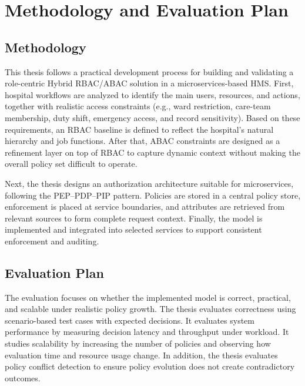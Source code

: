 \section{Methodology and Evaluation Plan}

\subsection{Methodology}
This thesis follows a practical development process for building and validating a role-centric Hybrid RBAC/ABAC solution in a microservices-based HMS. First, hospital workflows are analyzed to identify the main users, resources, and actions, together with realistic access constraints (e.g., ward restriction, care-team membership, duty shift, emergency access, and record sensitivity). Based on these requirements, an RBAC baseline is defined to reflect the hospital’s natural hierarchy and job functions. After that, ABAC constraints are designed as a refinement layer on top of RBAC to capture dynamic context without making the overall policy set difficult to operate.
\vspace{0.5cm}


Next, the thesis designs an authorization architecture suitable for microservices, following the PEP--PDP--PIP pattern. Policies are stored in a central policy store, enforcement is placed at service boundaries, and attributes are retrieved from relevant sources to form complete request context. Finally, the model is implemented and integrated into selected services to support consistent enforcement and auditing.

\subsection{Evaluation Plan}
The evaluation focuses on whether the implemented model is correct, practical, and scalable under realistic policy growth. The thesis evaluates correctness using scenario-based test cases with expected decisions. It evaluates system performance by measuring decision latency and throughput under workload. It studies scalability by increasing the number of policies and observing how evaluation time and resource usage change. In addition, the thesis evaluates policy conflict detection to ensure policy evolution does not create contradictory outcomes.

